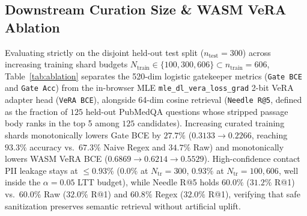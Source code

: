 \documentclass{article}
\begin{document}
\begin{table}[t]
\caption{Mean of $7$ interleaved OS process-spawn trials processing $1,207{\times}520$ rows across four execution substrates.}
\label{tab:substrates}
\vskip 0.08in
\begin{center}
\end{center}
\vskip -0.14in
\end{table}

\subsection{Downstream Curation Size \& WASM VeRA Ablation}
Evaluating strictly on the disjoint held-out test split ($n_{\text{test}}=300$) across increasing training shard budgets $N_{\text{train}} \in \{100, 300, 606\} \subset n_{\text{train}}=606$, Table~\ref{tab:ablation} separates the 520-dim logistic gatekeeper metrics (\texttt{Gate BCE} and \texttt{Gate Acc}) from the in-browser MLE \texttt{mle\_dl\_vera\_loss\_grad} 2-bit VeRA adapter head (\texttt{VeRA BCE}), alongside 64-dim cosine retrieval (\texttt{Needle R@5}, defined as the fraction of $125$ held-out PubMedQA questions whose stripped passage body ranks in the top 5 among $125$ candidates). Increasing curated training shards monotonically lowers Gate BCE by $27.7\%$ ($0.3133 \to 0.2266$, reaching $93.3\%$ accuracy vs.\ $67.3\%$ Naive Regex and $34.7\%$ Raw) and monotonically lowers WASM VeRA BCE ($0.6869 \to 0.6214 \to 0.5529$). High-confidence contact PII leakage stays at $\le 0.93\%$ ($0.0\%$ at $N_{\text{tr}}=300$, $0.93\%$ at $N_{\text{tr}}=100, 606$, well inside the $\alpha=0.05$ LTT budget), while Needle R@5 holds $60.0\%$ ($31.2\%$ R@1) vs.\ $60.0\%$ Raw ($32.0\%$ R@1) and $60.8\%$ Regex ($32.0\%$ R@1), verifying that safe sanitization preserves semantic retrieval without artificial uplift.
\end{document}
